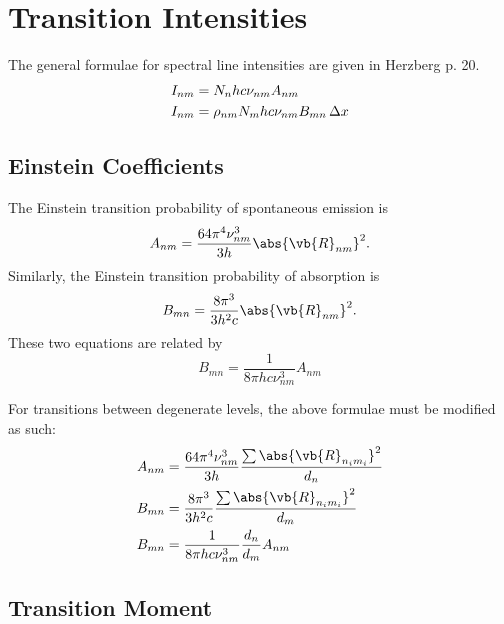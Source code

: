 \documentclass[11pt, twoside, fleqn]{report}
\begin{document}
    \section{Transition Intensities}

    The general formulae for spectral line intensities are given in Herzberg p. 20.
    \begin{align*}
        I_{nm} & = N_nhc\nu_{nm}A_{nm}                  \\
        I_{nm} & = \rho_{nm}N_mhc\nu_{nm}B_{mn}\adif{x}
    \end{align*}

    \subsection{Einstein Coefficients}

    The Einstein transition probability of spontaneous emission is
    \begin{equation*}
        A_{nm} = \frac{64\pi^4\nu_{nm}^3}{3h}\abs{\vb{R}_{nm}}^2.
    \end{equation*}
    Similarly, the Einstein transition probability of absorption is
    \begin{equation*}
        B_{mn} = \frac{8\pi^3}{3h^2c}\abs{\vb{R}_{nm}}^2.
    \end{equation*}
    These two equations are related by
    \begin{equation*}
        B_{mn} = \frac{1}{8\pi hc\nu_{nm}^3}A_{nm}
    \end{equation*}

    For transitions between degenerate levels, the above formulae must be modified as such:
    \begin{align*}
        A_{nm} & = \frac{64\pi^4\nu_{nm}^3}{3h}\frac{\sum\abs{\vb{R}_{n_im_i}}^2}{d_n} \\
        B_{mn} & = \frac{8\pi^3}{3h^2c}\frac{\sum\abs{\vb{R}_{n_im_i}}^2}{d_m}         \\
        B_{mn} & = \frac{1}{8\pi hc\nu_{nm}^3}\frac{d_n}{d_m}A_{nm}
    \end{align*}

    \subsection{Transition Moment}
\end{document}
